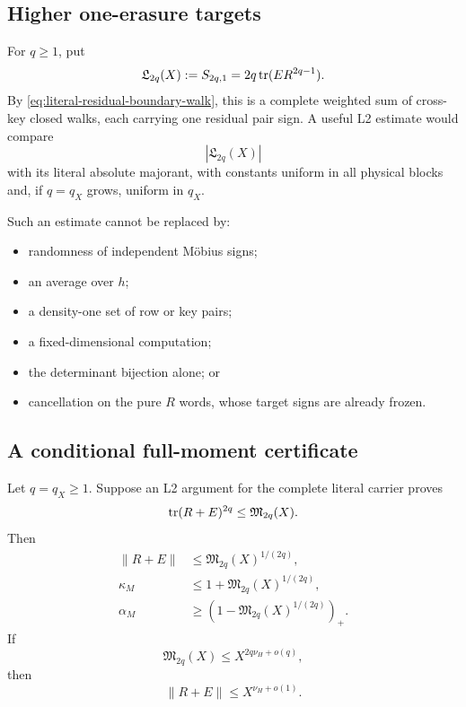 \subsection{Higher one-erasure targets}

For \(q\ge1\), put
\begin{equation}
 \mathfrak L_{2q}(X)
 :=
 S_{2q,1}
 =
 2q\operatorname{tr}(ER^{2q-1}).
 \label{eq:linear-erasure-target}
\end{equation}
By \eqref{eq:literal-residual-boundary-walk}, this is a complete weighted
sum of cross-key closed walks, each carrying one residual pair sign.  A
useful L2 estimate would compare
\[
 |\mathfrak L_{2q}(X)|
\]
with its literal absolute majorant, with constants uniform in all physical
blocks and, if \(q=q_X\) grows, uniform in \(q_X\).

Such an estimate cannot be replaced by:
\begin{itemize}
 \item randomness of independent Möbius signs;
 \item an average over \(h\);
 \item a density-one set of row or key pairs;
 \item a fixed-dimensional computation;
 \item the determinant bijection alone; or
 \item cancellation on the pure \(R\) words, whose target signs are already
       frozen.
\end{itemize}

\subsection{A conditional full-moment certificate}

\begin{proposition}
\label{prop:conditional-moment-certificate}
Let \(q=q_X\ge1\).  Suppose an L2 argument for the complete literal carrier
proves
\begin{equation}
 \operatorname{tr}(R+E)^{2q}
 \le \mathfrak M_{2q}(X).
 \label{eq:L2-full-moment-premise}
\end{equation}
Then
\begin{align}
 \|R+E\|
 &\le \mathfrak M_{2q}(X)^{1/(2q)},
 \label{eq:moment-operator-bound}\\
 \kappa_M
 &\le1+\mathfrak M_{2q}(X)^{1/(2q)},
 \label{eq:moment-native-upper}\\
 \alpha_M
 &\ge
 \left(1-\mathfrak M_{2q}(X)^{1/(2q)}\right)_+.
 \label{eq:moment-native-lower}
\end{align}
If
\[
 \mathfrak M_{2q}(X)
 \le X^{2q\nu_H+o(q)},
\]
then
\[
 \|R+E\|\le X^{\nu_H+o(1)}.
\]
\end{proposition}

